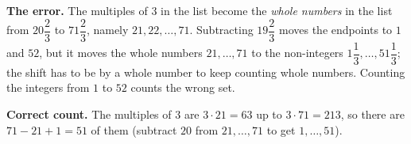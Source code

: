 \textbf{The error.} The multiples of $3$ in the list become the \emph{whole numbers} in the list from $20\dfrac{2}{3}$ to $71\dfrac{2}{3}$, namely $21,22,\dots,71$. Subtracting $19\dfrac{2}{3}$ moves the endpoints to $1$ and $52$, but it moves the whole numbers $21,\dots,71$ to the non-integers $1\dfrac{1}{3},\dots,51\dfrac{1}{3}$; the shift has to be by a whole number to keep counting whole numbers. Counting the integers from $1$ to $52$ counts the wrong set.

\textbf{Correct count.} The multiples of $3$ are $3\cdot21=63$ up to $3\cdot71=213$, so there are $71-21+1=\boxed{51}$ of them (subtract $20$ from $21,\dots,71$ to get $1,\dots,51$).
